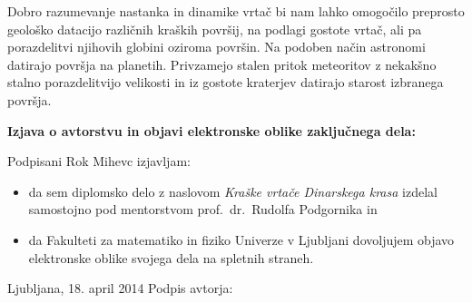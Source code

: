 \documentclass[a4paper, twoside, 12pt]{book}
\begin{document}
Dobro razumevanje nastanka in dinamike vrtač bi nam lahko omogočilo preprosto geološko datacijo različnih kraških površij, na podlagi gostote vrtač, ali pa porazdelitvi njihovih globini oziroma površin. Na podoben način astronomi datirajo površja na planetih. Privzamejo stalen pritok meteoritov z nekakšno stalno porazdelitvijo velikosti in iz gostote kraterjev datirajo starost izbranega površja. \cite{trey2011size}

    \newpage \thispagestyle{empty}


    \nocite{*}
    \newpage
    {}
    

    \newpage \thispagestyle{empty}



    \vspace*{1cm}
    \begin{center} {\Large \textbf{\sc Izjava o avtorstvu in objavi elektronske oblike zaključnega dela: }} \end{center}

      \vspace{1cm} \noindent Podpisani Rok Mihevc izjavljam:
      \noindent 

      \begin{itemize}
        \item 
          da sem diplomsko delo z naslovom \emph{Kraške vrtače Dinarskega krasa} izdelal samostojno pod mentorstvom prof.\ dr.\ \mbox{Rudolfa} \mbox{Podgornika} in
        \item
          da Fakulteti za matematiko in fiziko Univerze v Ljubljani dovoljujem objavo elektronske 
          oblike svojega dela na spletnih straneh.
      \end{itemize}

      \vspace{1cm} \noindent Ljubljana, 18. april 2014 \hfill Podpis avtorja:


      
\end{document}
